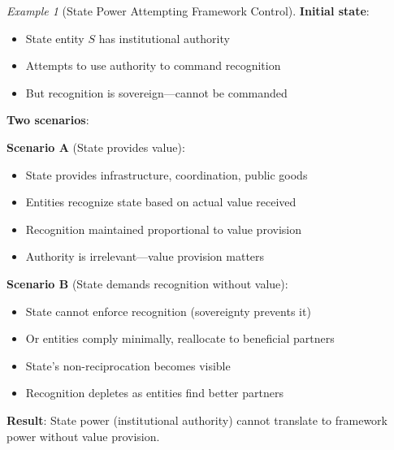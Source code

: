 \documentclass[11pt,a4paper]{article}
\theoremstyle{definition}
\theoremstyle{remark}
\newtheorem{example}[theorem]{Example}
\begin{document}
\begin{example}[State Power Attempting Framework Control]
\textbf{Initial state}:
\begin{itemize}
\item State entity $S$ has institutional authority
\item Attempts to use authority to command recognition
\item But recognition is sovereign—cannot be commanded
\end{itemize}

\textbf{Two scenarios}:

\textbf{Scenario A} (State provides value):
\begin{itemize}
\item State provides infrastructure, coordination, public goods
\item Entities recognize state based on actual value received
\item Recognition maintained proportional to value provision
\item Authority is irrelevant—value provision matters
\end{itemize}

\textbf{Scenario B} (State demands recognition without value):
\begin{itemize}
\item State cannot enforce recognition (sovereignty prevents it)
\item Or entities comply minimally, reallocate to beneficial partners
\item State's non-reciprocation becomes visible
\item Recognition depletes as entities find better partners
\end{itemize}

\textbf{Result}: State power (institutional authority) cannot translate to framework power without value provision.
\end{example}
\end{document}
